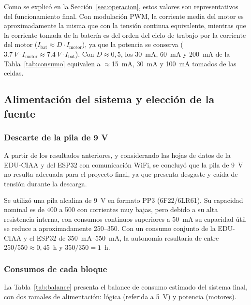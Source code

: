 Como se explicó en la Sección~\ref{sec:operacion}, estos valores son representativos del funcionamiento final. Con modulación PWM, la corriente media del motor es aproximadamente la misma que con la tensión continua equivalente, mientras que la corriente tomada de la batería es del orden del ciclo de trabajo por la corriente del motor ($I_{\text{bat}} \approx D \cdot I_{\text{motor}}$), ya que la potencia se conserva ($\SI{3,7}{V} \cdot I_{\text{motor}} \approx \SI{7,4}{V} \cdot I_{\text{bat}}$). Con $D \approx 0{,}5$, los \SI{30}{mA}, \SI{60}{mA} y \SI{200}{mA} de la Tabla~\ref{tab:consumo} equivalen a $\approx$\SI{15}{mA}, \SI{30}{mA} y \SI{100}{mA} tomados de las celdas.

\subsection{Alimentación del sistema y elección de la fuente}
\subsubsection{Descarte de la pila de 9 V}
A partir de los resultados anteriores, y considerando las hojas de datos de la EDU-CIAA y del ESP32 con comunicación WiFi, se concluyó que la pila de \SI{9}{V} no resulta adecuada para el proyecto final, ya que presenta desgaste y caída de tensión durante la descarga.


Se utilizó una pila alcalina de \SI{9}{V} en formato PP3 (6F22/6LR61). Su capacidad nominal es de \SI{400}{\mAh} a \SI{500}{\mAh} con corrientes muy bajas, pero debido a su alta resistencia interna, con consumos continuos superiores a \SI{50}{mA} su capacidad útil se reduce a aproximadamente \SI{250}{\mAh}--\SI{350}{\mAh}. Con un consumo conjunto de la EDU-CIAA y el ESP32 de \SI{350}{mA}--\SI{550}{mA}, la autonomía resultaría de entre $250/550 \approx 0{,}45$~h y $350/350 = 1$~h.


\subsubsection{Consumos de cada bloque}
La Tabla~\ref{tab:balance} presenta el balance de consumo estimado del sistema final, con dos ramales de alimentación: lógica (referida a \SI{5}{V}) y potencia (motores).

